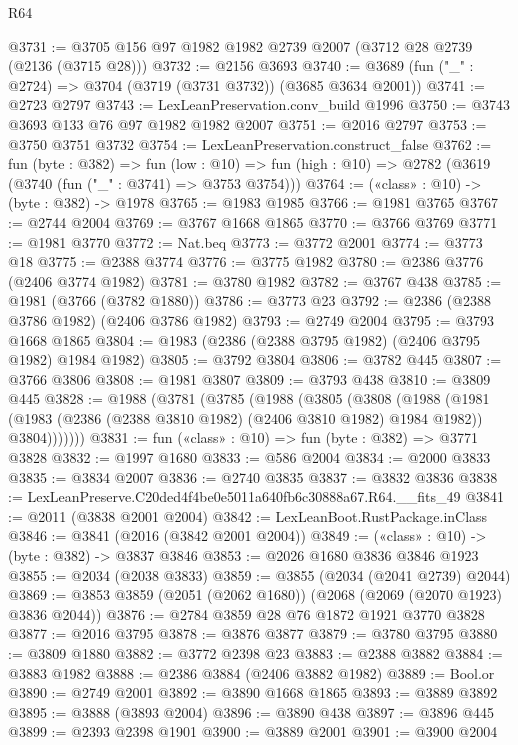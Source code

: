 \begin{lexlean}{R64}
\begin{coremodule}
@3731 := @3705 @156 @97 @1982 @1982 @2739 @2007 (@3712 @28 @2739 (@2136 (@3715 @28)))
@3732 := @2156 @3693
@3740 := @3689 (fun ("_" : @2724) => @3704 (@3719 (@3731 @3732)) (@3685 @3634 @2001))
@3741 := @2723 @2797
@3743 := LexLeanPreservation.conv_build @1996
@3750 := @3743 @3693 @133 @76 @97 @1982 @1982 @2007
@3751 := @2016 @2797
@3753 := @3750 @3751 @3732
@3754 := LexLeanPreservation.construct_false
@3762 := fun (byte : @382) =>
  fun (low : @10) => fun (high : @10) => @2782 (@3619 (@3740 (fun ("_" : @3741) => @3753 @3754)))
@3764 := («class» : @10) -> (byte : @382) -> @1978
@3765 := @1983 @1985
@3766 := @1981 @3765
@3767 := @2744 @2004
@3769 := @3767 @1668 @1865
@3770 := @3766 @3769
@3771 := @1981 @3770
@3772 := Nat.beq
@3773 := @3772 @2001
@3774 := @3773 @18
@3775 := @2388 @3774
@3776 := @3775 @1982
@3780 := @2386 @3776 (@2406 @3774 @1982)
@3781 := @3780 @1982
@3782 := @3767 @438
@3785 := @1981 (@3766 (@3782 @1880))
@3786 := @3773 @23
@3792 := @2386 (@2388 @3786 @1982) (@2406 @3786 @1982)
@3793 := @2749 @2004
@3795 := @3793 @1668 @1865
@3804 := @1983 (@2386 (@2388 @3795 @1982) (@2406 @3795 @1982) @1984 @1982)
@3805 := @3792 @3804
@3806 := @3782 @445
@3807 := @3766 @3806
@3808 := @1981 @3807
@3809 := @3793 @438
@3810 := @3809 @445
@3828 := @1988
    (@3781
      (@3785
        (@1988
          (@3805
            (@3808
              (@1988
                (@1981
                  (@1983 (@2386 (@2388 @3810 @1982) (@2406 @3810 @1982) @1984 @1982))
                  @3804)))))))
@3831 := fun («class» : @10) => fun (byte : @382) => @3771 @3828
@3832 := @1997 @1680
@3833 := @586 @2004
@3834 := @2000 @3833
@3835 := @3834 @2007
@3836 := @2740 @3835
@3837 := @3832 @3836
@3838 := LexLeanPreserve.C20ded4f4be0e5011a640fb6c30888a67.R64.__fits_49
@3841 := @2011 (@3838 @2001 @2004)
@3842 := LexLeanBoot.RustPackage.inClass
@3846 := @3841 (@2016 (@3842 @2001 @2004))
@3849 := («class» : @10) -> (byte : @382) -> @3837 @3846
@3853 := @2026 @1680 @3836 @3846 @1923
@3855 := @2034 (@2038 @3833)
@3859 := @3855 (@2034 (@2041 @2739) @2044)
@3869 := @3853 @3859 (@2051 (@2062 @1680)) (@2068 (@2069 (@2070 @1923) @3836 @2044))
@3876 := @2784 @3859 @28 @76 @1872 @1921 @3770 @3828
@3877 := @2016 @3795
@3878 := @3876 @3877
@3879 := @3780 @3795
@3880 := @3809 @1880
@3882 := @3772 @2398 @23
@3883 := @2388 @3882
@3884 := @3883 @1982
@3888 := @2386 @3884 (@2406 @3882 @1982)
@3889 := Bool.or
@3890 := @2749 @2001
@3892 := @3890 @1668 @1865
@3893 := @3889 @3892
@3895 := @3888 (@3893 @2004)
@3896 := @3890 @438
@3897 := @3896 @445
@3899 := @2393 @2398 @1901
@3900 := @3889 @2001
@3901 := @3900 @2004

\end{coremodule}
\end{lexlean}
